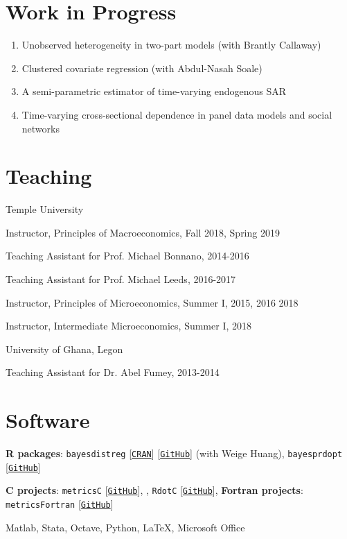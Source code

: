\documentclass[letterpaper]{article}
\renewenvironment{itemize}{
  \begin{list}{}{
    \setlength{\leftmargin}{1.5em}
  }
}{
  \end{list}
}
\begin{document}
\section*{Work in Progress}
\begin{enumerate}
	\item Unobserved heterogeneity in two-part models (with Brantly Callaway)
	\item Clustered covariate regression (with Abdul-Nasah Soale)
	\item A semi-parametric estimator of time-varying endogenous SAR
	\item Time-varying cross-sectional dependence in panel data models and social networks
\end{enumerate}

\section*{Teaching}
\begin{enumerate}
	\item Temple University
	\begin{itemize}
		\item Instructor, Principles of Macroeconomics, Fall 2018, Spring 2019
		\item Teaching Assistant for Prof. Michael Bonnano, 2014-2016
		\item Teaching Assistant for Prof. Michael Leeds, 2016-2017
		\item Instructor, Principles of Microeconomics, Summer I, 2015, 2016 2018
		\item Instructor, Intermediate Microeconomics, Summer I, 2018
	\end{itemize}
	\item University of Ghana, Legon
	\begin{itemize}
		\item Teaching Assistant for Dr. Abel Fumey, 2013-2014
	\end{itemize}
\end{enumerate}


\section*{Software}
\begin{itemize}
  \item \textbf{R packages}: \texttt{bayesdistreg} [\texttt{\href{https://CRAN.R-project.org/package=bayesdistreg}{CRAN}}] [\texttt{\href{https://estsyawo.github.io/bayesdistreg/}{GitHub}}] (with Weige Huang), \texttt{bayesprdopt} [\texttt{\href{https://github.com/estsyawo/bayesprdopt}{GitHub}}]

  \item \textbf{C projects}: \texttt{metricsC} [\texttt{\href{https://github.com/estsyawo/metricsC}{GitHub}}], , \texttt{RdotC} [\texttt{\href{https://github.com/estsyawo/RdotC}{GitHub}}], \textbf{Fortran projects}: \texttt{metricsFortran} [\texttt{\href{https://github.com/estsyawo/metricsFortran}{GitHub}}]
  \item Matlab,  Stata, Octave, Python, \LaTeX, Microsoft Office
\end{itemize}
\end{document}
